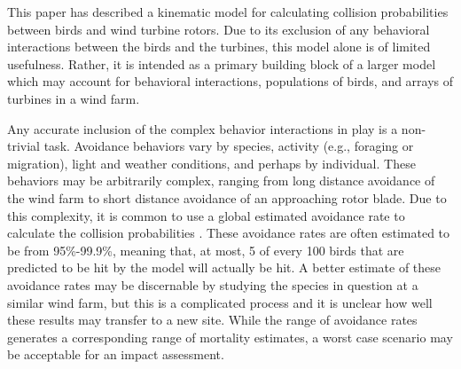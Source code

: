 \label{} \documentclass[10pt,conference]{IEEEtran}
\begin{document}
This paper has described a kinematic model for calculating collision probabilities between birds and wind turbine
rotors. Due to its exclusion of any behavioral interactions between the birds and the turbines, this model alone is of
limited usefulness. Rather, it is intended as a primary building block of a larger model which may account for
behavioral interactions, populations of birds, and arrays of turbines in a wind farm.

Any accurate inclusion of the complex behavior interactions in play is a non-trivial task. Avoidance behaviors vary by
species, activity (e.g., foraging or migration), light and weather conditions, and perhaps by individual. These
behaviors may be arbitrarily complex, ranging from long distance avoidance of the wind farm to short distance avoidance
of an approaching rotor blade. Due to this complexity, it is common to use a global estimated avoidance rate to
calculate the collision probabilities \cite{Cooper2004}\cite{Podolsky2005}. These avoidance rates are often estimated
to be from 95\%-99.9\%, meaning that, at most, 5 of every 100 birds that are predicted to be hit by the model will
actually be hit. A better estimate of these avoidance rates may be discernable by studying the species in question at a
similar wind farm, but this is a complicated process and it is unclear how well these results may transfer to a new
site. While the range of avoidance rates generates a corresponding range of mortality estimates, a worst case scenario
may be acceptable for an impact assessment.




\end{document}

